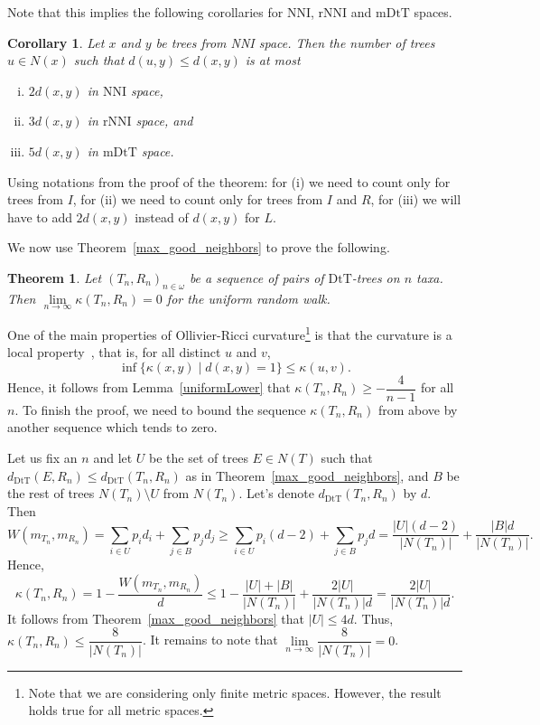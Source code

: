 \documentclass{amsart}
\newtheorem{corollary}[lemma]{Corollary}
\newtheorem{theorem}[lemma]{Theorem}
\newcommand{\dts}{\mathrm{DtT}}
\newcommand{\nni}{\mathrm{NNI}}
\newcommand{\rnni}{\mathrm{rNNI}}
\newcommand{\mdts}{\mathrm{mDtT}}
\begin{document}
Note that this implies the following corollaries for $\nni$, $\rnni$ and $\mdts$ spaces.
\begin{corollary}
Let $x$ and $y$ be trees from NNI space.
Then the number of trees $u \in N(x)$ such that $d(u, y) \le d(x, y)$ is at most
\begin{enumerate}[(i)]
\item $2d(x,y)$ in $\nni$ space,
\item $3d(x,y)$ in $\rnni$ space, and
\item $5d(x,y)$ in $\mdts$ space.
\end{enumerate}
\end{corollary}

\proof
Using notations from the proof of the theorem: for (i) we need to count only for trees from $I$, for (ii) we need to count only for trees from $I$ and $R$, for (iii) we will have to add $2d(x,y)$ instead of $d(x,y)$ for $L$.
\endproof

We now use Theorem~\ref{max_good_neighbors} to prove the following.

\begin{theorem}\label{zero-in-the-limit}
Let $(T_n,R_n)_{n\in\omega}$ be a sequence of pairs of $\dts$-trees on $n$ taxa.
Then $\lim\limits_{n \to \infty}\kappa(T_n,R_n) = 0$ for the uniform random walk.
\end{theorem}

\proof
One of the main properties of Ollivier-Ricci curvature\footnote{Note that we are considering only finite metric spaces.
However, the result holds true for all metric spaces.}
is that the curvature is a local property~\cite{Ollivier2009-cj}, that is, for all distinct $u$ and $v$,
\[
\inf\{\kappa(x,y)\mid d(x,y) = 1\} \leq \kappa(u,v).
\]
Hence, it follows from Lemma~\ref{uniformLower} that $\kappa(T_n,R_n) \geq -\dfrac{4}{n-1}$ for all $n$.
To finish the proof, we need to bound the sequence $\kappa(T_n,R_n)$ from above by another sequence which tends to zero.

Let us fix an $n$ and let $U$ be the set of trees $E \in N(T)$ such that $d_\dts(E,R_n) \leq d_\dts(T_n,R_n)$ as in Theorem~\ref{max_good_neighbors}, and $B$ be the rest of trees $N(T_n)\setminus U$ from $N(T_n)$.
Let's denote $d_\dts(T_n,R_n)$ by $d$. Then
\[
W(m_{T_n},m_{R_n}) = \sum_{i\in U} p_i d_i + \sum_{j\in B} p_j d_j \geq
\sum_{i\in U} p_i (d-2) + \sum_{j\in B} p_j d =
\frac{|U|(d-2)}{|N(T_n)|} + \frac{|B|d}{|N(T_n)|}.
\]
Hence,
\[
\kappa(T_n,R_n) = 1 - \frac{W(m_{T_n},m_{R_n})}{d} \leq
1 - \frac{|U| + |B|}{|N(T_n)|} + \frac{2|U|}{|N(T_n)|d}
= \frac{2|U|}{|N(T_n)|d}.
\]
It follows from Theorem~\ref{max_good_neighbors} that $|U| \leq 4d$.
Thus, $\kappa(T_n,R_n) \leq \dfrac{8}{|N(T_n)|}$.
It remains to note that $\lim\limits_{n\to\infty}\dfrac{8}{|N(T_n)|} = 0$.
\endproof
\end{document}
